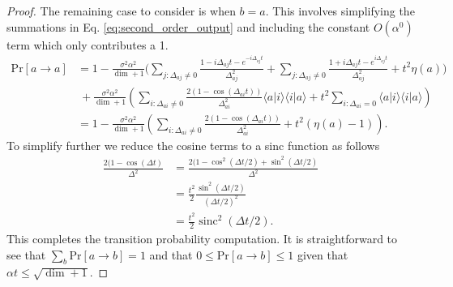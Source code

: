 \documentclass{article}
\newcommand{\braket}[2]{\langle #1|#2\rangle}
\newcommand{\parens}[1]{\left( #1 \right)}
\newcommand{\prob}[1]{\text{Pr}\left[ #1 \right]}
\newcommand{\bigo}[1]{O\left( #1 \right)}
\DeclareMathOperator{\sinc}{sinc}
\begin{document}
\begin{proof}
    The remaining case to consider is when $b = a$. This involves simplifying the summations in Eq. \eqref{eq:second_order_output} and including the constant $\bigo{\alpha^0}$ term which only contributes a 1. 
    \begin{align}
        \prob{a \to a} &= 1 -\frac{\sigma^2 \alpha^2 }{\dim + 1} \bigg(\sum_{j: \Delta_{aj} \neq 0} \frac{1 - i \Delta_{aj}t - e^{-i \Delta_{aj} t}}{\Delta_{aj}^2} + \sum_{j: \Delta_{aj} \neq 0} \frac{1 + i \Delta_{aj} t - e^{i \Delta_{aj} t}}{\Delta_{aj}^2} + t^2 \eta(a) \bigg) \nonumber \\
    &~ +\frac{\sigma^2 \alpha^2 }{\dim+1} \parens{ \sum_{i: \Delta_{ai} \neq 0 } \frac{2(1- \cos (\Delta_{ai}t))}{\Delta_{ai}^2} \braket{a}{i} \braket{i}{a} + t^2  \sum_{i : \Delta_{ai} = 0} \braket{a}{i} \braket{i}{a}} \\
    &= 1 - \frac{\sigma^2 \alpha^2}{\dim + 1} \parens{\sum_{i: \Delta_{ai} \neq 0} \frac{2(1 - \cos(\Delta_{ai}t))}{\Delta_{ai}^2} + t^2 (\eta(a) - 1)}.
    \end{align}
    To simplify further we reduce the cosine terms to a sinc function as follows
    \begin{align}
        \frac{2(1 - \cos(\Delta t)}{\Delta^2} &= \frac{2(1 - \cos^2(\Delta t / 2) + \sin^2(\Delta t /2)}{\Delta^2} \\
        &= \frac{t^2}{2} \frac{\sin^2 (\Delta t / 2)}{ (\Delta t/ 2)^2} \\
        &= \frac{t^2}{2} \sinc^2(\Delta t /2).
    \end{align}
    This completes the transition probability computation. It is straightforward to see that $\sum_{b} \prob{a \to b} = 1$ and that $0 \leq \prob{a \to b} \leq 1$ given that $\alpha t \leq \sqrt{\dim + 1}$.
\end{proof}
\end{document}
